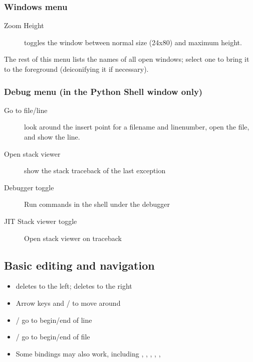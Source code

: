 

\subsubsection{Windows menu}

\begin{description}
\item[Zoom Height]    toggles the window between normal size (24x80)
        and maximum height.
\end{description}

The rest of this menu lists the names of all open windows; select one
to bring it to the foreground (deiconifying it if necessary).


\subsubsection{Debug menu (in the Python Shell window only)}

\begin{description}
\item[Go to file/line]        look around the insert point for a filename
                and linenumber, open the file, and show the line.
\item[Open stack viewer]      show the stack traceback of the last exception
\item[Debugger toggle]        Run commands in the shell under the debugger
\item[JIT Stack viewer toggle]        Open stack viewer on traceback
\end{description}



\subsection{Basic editing and navigation}

\begin{itemize}
\item   {} deletes to the left;  deletes to the right
\item   Arrow keys and / to move around
\item   {}/ go to begin/end of line
\item   {}/ go to begin/end of file
\item   Some  bindings may also work, including ,
        , , , , 
\end{itemize}


